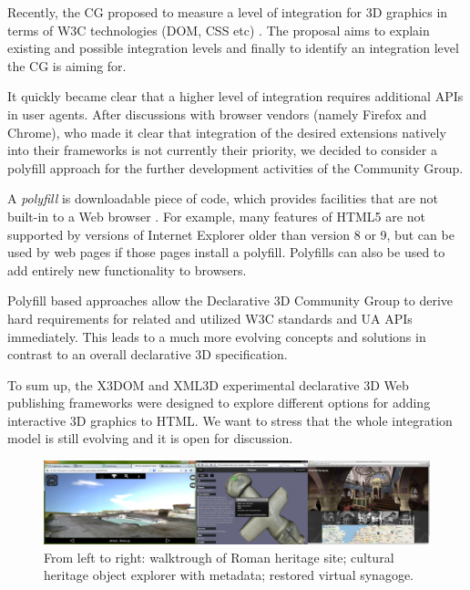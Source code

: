 \documentclass[review]{acmsiggraph}
\begin{document}
Recently, the CG proposed to measure a level of integration for 3D graphics in terms of W3C technologies (DOM, CSS etc) \cite{Dec3D-LevelsOfIntegration}. The proposal aims to explain existing and possible integration levels and finally to identify an integration level the CG is aiming for.

It quickly became clear that a higher level of integration requires additional APIs in user agents. After discussions with browser vendors (namely Firefox and Chrome), who made it clear that integration of the desired extensions natively into their frameworks is not currently their priority, we decided to consider a polyfill approach for the further development activities of the Community Group.

A \textit{polyfill} is downloadable piece of code, which provides facilities that are not built-in to a Web browser \cite{Sharp2010}. For example, many features of HTML5 are not supported by versions of Internet Explorer older than version 8 or 9, but can be used by web pages if those pages install a polyfill. Polyfills can also be used to add entirely new functionality to browsers.

Polyfill based approaches allow the Declarative 3D Community Group to derive hard requirements for related and utilized W3C standards and UA APIs immediately. This leads to a much more evolving concepts and solutions in contrast to an overall declarative 3D specification.

To sum up, the X3DOM and XML3D experimental declarative 3D Web publishing frameworks were designed to explore different options for adding interactive 3D graphics to HTML. We want to stress that the whole integration model is still evolving and it is open for discussion.

\begin{figure}
  \centering
  \includegraphics[width=1.0\textwidth]{images/ch_apps.png}
  \caption{From left to right: walktrough of Roman heritage site; cultural heritage object explorer with metadata; restored virtual synagoge.}
  \vspace{-0.2cm}
\end{figure}
\end{document}
